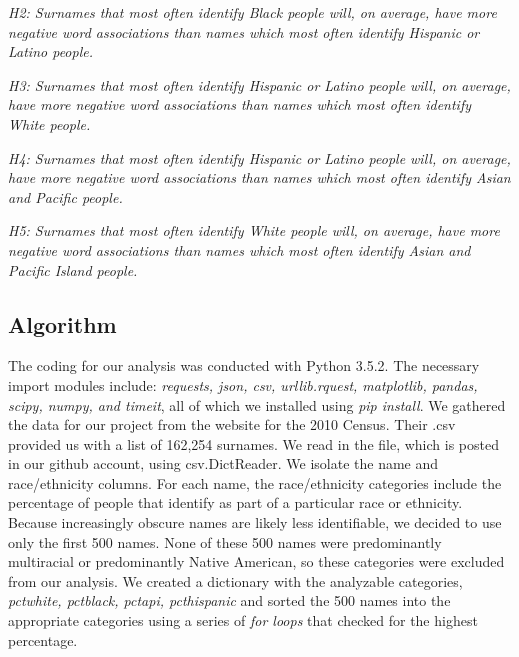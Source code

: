 \documentclass[sigconf]{acmart}
\begin{document}
\vspace{2mm}

{\em H2: Surnames that most often identify Black people will, on average, have more negative word associations than names which most often identify Hispanic or Latino people.} \\
\vspace{2mm}

{\em H3: Surnames that most often identify Hispanic or Latino people will, on average, have more negative word associations than names which most often identify White people.} \\

\vspace{2mm}

{\em H4: Surnames that most often identify Hispanic or Latino people will, on average, have more negative word associations than names which most often identify Asian and Pacific people.} \\

\vspace{2mm}

{\em H5: Surnames that most often identify White people will, on average, have more negative word associations than names which most often identify Asian and Pacific Island people.} \\

\subsection{Algorithm}

The coding for our analysis was conducted with Python 3.5.2. The necessary import modules include: {\em requests, json, csv, urllib.rquest, matplotlib, pandas, scipy, numpy, and timeit}, all of which we installed using {\em pip install}. We gathered the data for our project from the website for the 2010 Census. Their .csv provided us with a list of 162,254 surnames. We read in the file, which is posted in our github account, using csv.DictReader. We isolate the name and race/ethnicity columns. For each name, the race/ethnicity categories include the percentage of people that identify as part of a particular race or ethnicity. Because increasingly obscure names are likely less identifiable, we decided to use only the first 500 names. None of these 500 names were predominantly multiracial or predominantly Native American, so these categories were excluded from our analysis. We created a dictionary with the analyzable categories, {\em pctwhite, pctblack, pctapi, pcthispanic} and sorted the 500 names into the appropriate categories using a series of {\em for loops} that checked for the highest percentage. 
\end{document}
